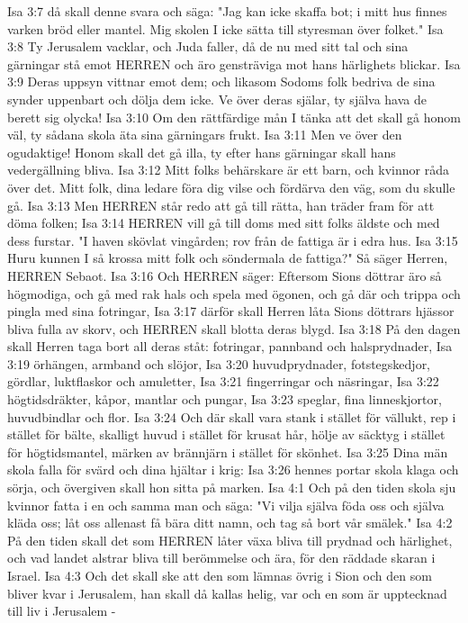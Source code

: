 Isa 3:7  då skall denne svara och säga: "Jag kan icke skaffa bot; i mitt hus finnes varken bröd eller mantel. Mig skolen I icke sätta till styresman över folket."
Isa 3:8  Ty Jerusalem vacklar, och Juda faller, då de nu med sitt tal och sina gärningar stå emot HERREN och äro gensträviga mot hans härlighets blickar.
Isa 3:9  Deras uppsyn vittnar emot dem; och likasom Sodoms folk bedriva de sina synder uppenbart och dölja dem icke. Ve över deras själar, ty själva hava de berett sig olycka!
Isa 3:10  Om den rättfärdige mån I tänka att det skall gå honom väl, ty sådana skola äta sina gärningars frukt.
Isa 3:11  Men ve över den ogudaktige! Honom skall det gå illa, ty efter hans gärningar skall hans vedergällning bliva.
Isa 3:12  Mitt folks behärskare är ett barn, och kvinnor råda över det. Mitt folk, dina ledare föra dig vilse och fördärva den väg, som du skulle gå.
Isa 3:13  Men HERREN står redo att gå till rätta, han träder fram för att döma folken;
Isa 3:14  HERREN vill gå till doms med sitt folks äldste och med dess furstar. "I haven skövlat vingården; rov från de fattiga är i edra hus.
Isa 3:15  Huru kunnen I så krossa mitt folk och söndermala de fattiga?" Så säger Herren, HERREN Sebaot.
Isa 3:16  Och HERREN säger: Eftersom Sions döttrar äro så högmodiga, och gå med rak hals och spela med ögonen, och gå där och trippa och pingla med sina fotringar,
Isa 3:17  därför skall Herren låta Sions döttrars hjässor bliva fulla av skorv, och HERREN skall blotta deras blygd.
Isa 3:18  På den dagen skall Herren taga bort all deras ståt: fotringar, pannband och halsprydnader,
Isa 3:19  örhängen, armband och slöjor,
Isa 3:20  huvudprydnader, fotstegskedjor, gördlar, luktflaskor och amuletter,
Isa 3:21  fingerringar och näsringar,
Isa 3:22  högtidsdräkter, kåpor, mantlar och pungar,
Isa 3:23  speglar, fina linneskjortor, huvudbindlar och flor.
Isa 3:24  Och där skall vara stank i stället för vällukt, rep i stället för bälte, skalligt huvud i stället för krusat hår, hölje av säcktyg i stället för högtidsmantel, märken av brännjärn i stället för skönhet.
Isa 3:25  Dina män skola falla för svärd och dina hjältar i krig:
Isa 3:26  hennes portar skola klaga och sörja, och övergiven skall hon sitta på marken.
Isa 4:1  Och på den tiden skola sju kvinnor fatta i en och samma man och säga: "Vi vilja själva föda oss och själva kläda oss; låt oss allenast få bära ditt namn, och tag så bort vår smälek."
Isa 4:2  På den tiden skall det som HERREN låter växa bliva till prydnad och härlighet, och vad landet alstrar bliva till berömmelse och ära, för den räddade skaran i Israel.
Isa 4:3  Och det skall ske att den som lämnas övrig i Sion och den som bliver kvar i Jerusalem, han skall då kallas helig, var och en som är upptecknad till liv i Jerusalem -
